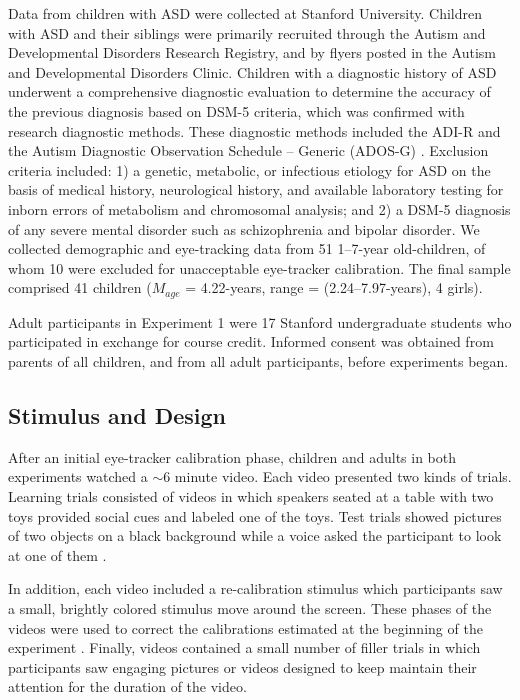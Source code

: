 \documentclass{pnastwo}
\begin{document}
\begin{article}
\begin{materials}
Data from children with ASD were collected at Stanford University. Children with ASD and their siblings were primarily recruited through the Autism and Developmental Disorders Research Registry, and by flyers posted in the Autism and Developmental Disorders Clinic. Children with a diagnostic history of ASD underwent a comprehensive diagnostic evaluation to determine the accuracy of the previous diagnosis based on DSM-5 criteria, which was confirmed with research diagnostic methods. These diagnostic methods included the ADI-R \citep{lord1994,le-couter1989} and the Autism Diagnostic Observation Schedule -- Generic (ADOS-G) \citep{lord1999,lord2000}. Exclusion criteria included: 1) a genetic, metabolic, or infectious etiology for ASD on the basis of medical history, neurological history, and available laboratory testing for inborn errors of metabolism and chromosomal analysis; and 2) a DSM-5 diagnosis of any severe mental disorder such as schizophrenia and bipolar disorder. We collected demographic and eye-tracking data from 51 1--7-year old-children, of whom 10 were excluded for unacceptable eye-tracker calibration. The final sample comprised 41 children ({\small$M_{age}$} = 4.22-years, range = (2.24--7.97-years), 4 girls).

Adult participants in Experiment 1 were 17 Stanford undergraduate students who participated in exchange for course credit. Informed consent was obtained from parents of all children, and from all adult participants, before experiments began.

\subsection{Stimulus and Design} After an initial eye-tracker calibration phase, children and adults in both experiments watched a $\sim$6 minute video. Each video presented two kinds of trials. Learning trials consisted of videos in which speakers seated at a table with two toys provided social cues and labeled one of the toys. Test trials showed pictures of two objects on a black background while a voice asked the participant to look at one of them \citep[as in][]{fernald1998}.

In addition, each video included a re-calibration stimulus which participants saw a small, brightly colored stimulus move around the screen. These phases of the videos were used to correct the calibrations estimated at the beginning of the experiment \citep[see][]{frank2012}. Finally, videos contained a small number of filler trials in which participants saw engaging pictures or videos designed to keep maintain their attention for the duration of the video.


\end{materials}
\end{article}
\end{document}
